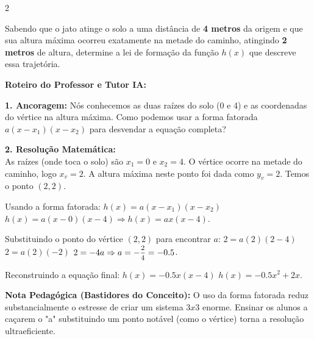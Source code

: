 \begin{multicols*}{2}
\begin{enunciadoLiteral}
Sabendo que o jato atinge o solo a uma distância de \textbf{4 metros} da origem e que sua altura máxima ocorreu exatamente na metade do caminho, atingindo \textbf{2 metros} de altura, determine a lei de formação da função $h(x)$ que descreve essa trajetória.
\end{enunciadoLiteral}

\ifgabarito
    \begin{tcolorbox}[colback=CorTitUm!5, colframe=CorTitUm, boxrule=1pt, arc=4pt, left=6pt, right=6pt, top=6pt, bottom=6pt]
    \small\textbf{\textcolor{CorTitUm}{Roteiro do Professor e Tutor IA:}}\par\vspace{0.1cm}
    \color{CinzaEscuro}
    \textbf{1. Ancoragem:} Nós conhecemos as duas raízes do solo (0 e 4) e as coordenadas do vértice na altura máxima. Como podemos usar a forma fatorada $a(x - x_1)(x - x_2)$ para desvendar a equação completa?\par\vspace{0.1cm}
    \textbf{2. Resolução Matemática:}\\
    As raízes (onde toca o solo) são $x_1=0$ e $x_2=4$. 
    O vértice ocorre na metade do caminho, logo $x_v = 2$. A altura máxima neste ponto foi dada como $y_v = 2$. Temos o ponto $(2, 2)$.
    
    Usando a forma fatorada: 
    $h(x) = a(x - x_1)(x - x_2)$
    $h(x) = a(x - 0)(x - 4) \Rightarrow h(x) = ax(x - 4)$.
    
    Substituindo o ponto do vértice $(2, 2)$ para encontrar $a$:
    $2 = a(2)(2 - 4)$
    $2 = a(2)(-2)$
    $2 = -4a \Rightarrow a = -\mfrac{2}{4} = -0.5$.
    
    Reconstruindo a equação final: 
    $h(x) = -0.5x(x - 4)$
    $h(x) = -0.5x^2 + 2x$.
    \end{tcolorbox}
    \vspace{0.15cm}
    
    \begin{boxexplicacao}
    \textbf{Nota Pedagógica (Bastidores do Conceito):} O uso da forma fatorada reduz substancialmente o estresse de criar um sistema $3x3$ enorme. Ensinar os alunos a caçarem o "a" substituindo um ponto notável (como o vértice) torna a resolução ultraeficiente.
    \end{boxexplicacao}
\fi

\par\vspace{\espacoQuestao}


\end{multicols*}
